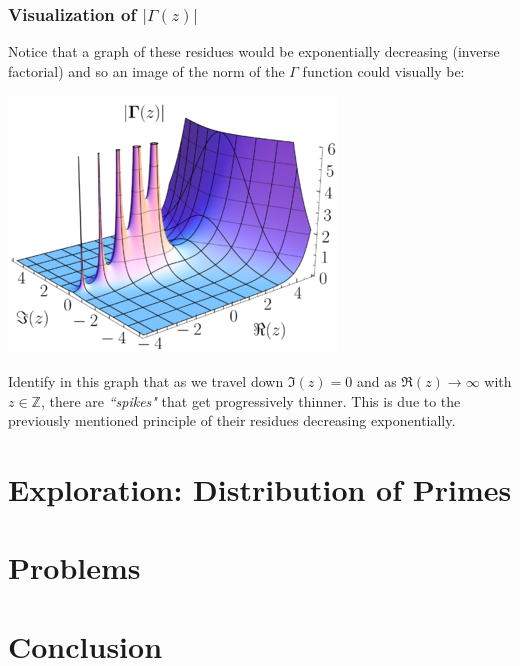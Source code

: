 \documentclass[14pt]{extarticle}
\begin{document}
\subsubsection{Visualization of $|\Gamma(z)|$}

Notice that a graph of these residues would be exponentially decreasing (inverse factorial) and so an image of the norm of the $\Gamma$
function could visually be:
\begin{center}
    \includegraphics[scale=0.75]{gamma_poles}
\end{center}

Identify in this graph that as we travel down $\Im(z) = 0$ and as $\Re(z) \to \infty$ with $z\in \mathbb{Z}$, there are \textit{``spikes"}
that get progressively thinner. This is due to the previously mentioned principle of their residues decreasing exponentially.
\pagebreak

\section{Exploration: Distribution of Primes}

\pagebreak

\section{Problems}

\pagebreak

\section{Conclusion}
\end{document}
